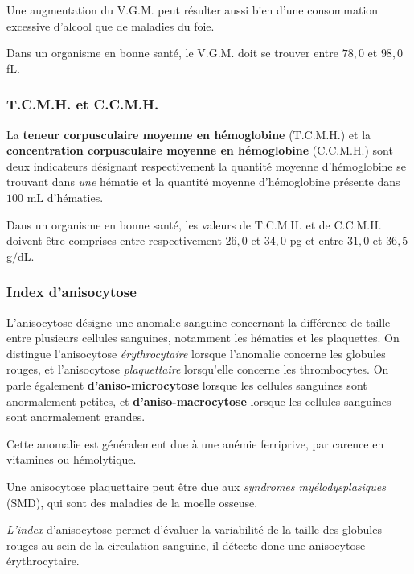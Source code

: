 \documentclass[12pt]{article}
\begin{document}
	Une augmentation du V.G.M. peut résulter aussi bien d'une consommation excessive d'alcool que de maladies du foie.
	
	Dans un organisme en bonne santé, le V.G.M. doit se trouver entre $78,0$ et $98,0$ fL.
	
	\subsubsection{T.C.M.H. et C.C.M.H.}
	La \textbf{teneur corpusculaire moyenne en hémoglobine} (T.C.M.H.) et la \textbf{concentration corpusculaire moyenne en hémoglobine} (C.C.M.H.) sont deux indicateurs désignant respectivement la quantité moyenne d'hémoglobine se trouvant dans \textit{une} hématie et la quantité moyenne d'hémoglobine présente dans $100$ mL d'hématies.
	
	Dans un organisme en bonne santé, les valeurs de T.C.M.H. et de C.C.M.H. doivent être comprises entre respectivement $26,0$ et $34,0$ pg et entre $31,0$ et $36,5$ g$/$dL.
	
	\subsubsection{Index d'anisocytose}
	L'anisocytose désigne une anomalie sanguine concernant la différence de taille entre plusieurs cellules sanguines, notamment les hématies et les plaquettes. On distingue l'anisocytose \textit{érythrocytaire} lorsque l'anomalie concerne les globules rouges, et l'anisocytose \textit{plaquettaire} lorsqu'elle concerne les thrombocytes. On parle également \textbf{d'aniso-microcytose} lorsque les cellules sanguines sont anormalement petites, et \textbf{d'aniso-macrocytose} lorsque les cellules sanguines sont anormalement grandes.
	
	Cette anomalie est généralement due à une anémie ferriprive, par carence en vitamines ou hémolytique.
	
	Une anisocytose plaquettaire peut être due aux \textit{syndromes myélodysplasiques} (SMD), qui sont des maladies de la moelle osseuse.
	
	\textit{L'index} d'anisocytose permet d'évaluer la variabilité de la taille des globules rouges au sein de la circulation sanguine, il détecte donc une anisocytose érythrocytaire.
	
\end{document}
